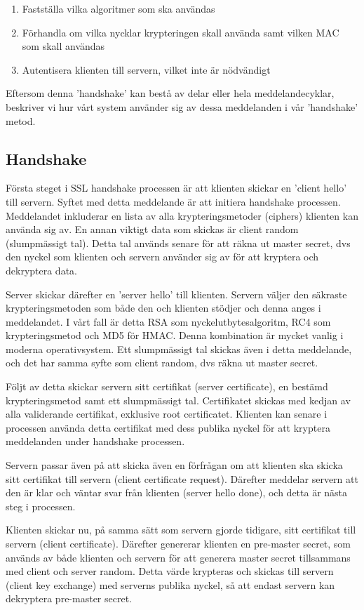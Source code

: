 \begin{enumerate}
\item{Fastställa vilka algoritmer som ska användas}
\item{Förhandla om vilka nycklar krypteringen skall använda samt vilken MAC som skall användas}
\item{Autentisera klienten till servern, vilket inte är nödvändigt}
\end{enumerate}

Eftersom denna 'handshake' kan bestå av delar eller hela meddelandecyklar, beskriver vi hur vårt system använder sig av dessa meddelanden i vår 'handshake' metod.

\subsection{Handshake}
Första steget i SSL handshake processen är att klienten skickar en 'client hello' till servern. Syftet med detta meddelande är att initiera handshake processen. Meddelandet inkluderar en lista av alla krypteringsmetoder (ciphers) klienten kan använda sig av. En annan viktigt data som skickas är client random (slumpmässigt tal). Detta tal används senare för att räkna ut master secret, dvs den nyckel som klienten och servern använder sig av för att kryptera och dekryptera data.

Server skickar därefter en 'server hello' till klienten. Servern väljer den säkraste krypteringsmetoden som både den och klienten stödjer och denna anges i meddelandet. I vårt fall är detta RSA som nyckelutbytesalgoritm, RC4 som krypteringsmetod och MD5 för HMAC. Denna kombination är mycket vanlig i moderna operativsystem. Ett slumpmässigt tal skickas även i detta meddelande, och det har samma syfte som client random, dvs räkna ut master secret.

Följt av detta skickar servern sitt certifikat (server certificate), en bestämd krypteringsmetod samt ett slumpmässigt tal. Certifikatet skickas med kedjan av alla validerande certifikat, exklusive root certificatet. Klienten kan senare i processen använda detta certifikat med dess publika nyckel för att kryptera meddelanden under handshake processen.

Servern passar även på att skicka även en förfrågan om att klienten ska skicka sitt certifikat till servern (client certificate request). Därefter meddelar servern att den är klar och väntar svar från klienten (server hello done), och detta är nästa steg i processen.

Klienten skickar nu, på samma sätt som servern gjorde tidigare, sitt certifikat till servern (client certificate). Därefter genererar klienten en pre-master secret, som används av både klienten och servern för att generera master secret tillsammans med client och server random. Detta värde krypteras och skickas till servern (client key exchange) med serverns publika nyckel, så att endast servern kan dekryptera pre-master secret.

